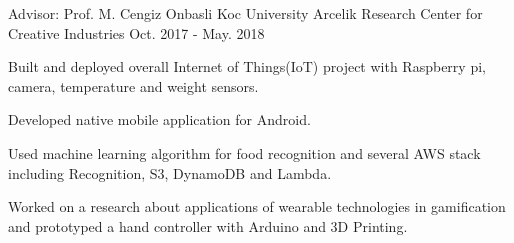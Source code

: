\begin{cventries}
  \cvopenentry
    {Advisor: Prof. M. Cengiz Onbasli} %
    {Koc University Arcelik Research Center for Creative Industries} %
    {}
    {Oct. 2017 - May. 2018} %
    {
      \begin{cvitems} %
        \item {Built and deployed overall Internet of Things(IoT) project with Raspberry pi, camera, temperature and weight sensors.  }
        \item {Developed native mobile application for Android. }
       	\item {Used machine learning algorithm for food recognition and several AWS stack including Recognition, S3, DynamoDB and Lambda.} 
         \item {Worked on a research about applications  of wearable technologies in gamification and prototyped a hand controller with Arduino and 3D Printing.}
      \end{cvitems}
    }


\end{cventries}
